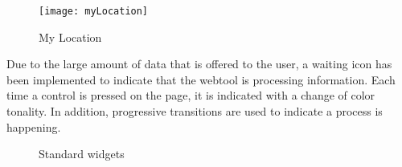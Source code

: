 
\begin{figure}[ht]
    \centering
    \texttt{[image: myLocation]}
    \caption{My Location}
\end{figure}



Due to the large amount of data that is offered to the user, a waiting icon has been implemented to indicate that the webtool is processing information.
Each time a control is pressed on the page, it is indicated with a change of color tonality.
In addition, progressive transitions are used to indicate a process is happening.\\

\begin{figure}[ht]
    \centering
    \hfill
    \vfill
    \hfill
    \caption{Standard widgets}
\end{figure}